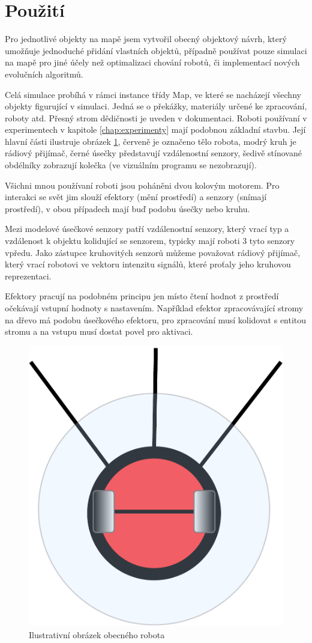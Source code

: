 \section*{Použití}
Pro jednotlivé objekty na mapě jsem vytvořil obecný objektový návrh, který umožňuje jednoduché přidání vlastních objektů, případně používat pouze simulaci na mapě pro jiné účely než optimalizaci chování robotů, či implementací nových evolučních algoritmů.
\par
Celá simulace probíhá v rámci instance třídy Map, ve které se nacházejí všechny objekty figurující v simulaci. Jedná se o překážky, materiály určené ke zpracování, roboty atd. Přesný strom dědičnosti je uveden v dokumentaci. Roboti používaní v experimentech v kapitole \ref{chap:experimenty} mají podobnou základní stavbu. Její hlavní části ilustruje obrázek \ref{obr03:robotModel}, červeně je označeno tělo robota, modrý kruh je rádiový přijímač, černé úsečky představují vzdálenostní senzory, šedivě stínované obdélníky zobrazují kolečka (ve vizuálním programu se nezobrazují).
\par 
Všichni mnou používaní roboti jsou poháněni dvou kolovým motorem. Pro interakci se svět jim slouží efektory (mění prostředí) a senzory (snímají prostředí), v obou případech mají buď podobu úsečky nebo kruhu.
\par
 Mezi modelové úsečkové senzory patří vzdálenostní senzory, který vrací typ a vzdálenost k objektu kolidující se senzorem, typicky mají roboti 3 tyto senzory vpředu. Jako zástupce kruhovitých senzorů můžeme považovat rádiový přijímač, který vrací robotovi ve vektoru intenzitu signálů, které proťaly jeho kruhovou reprezentaci.
 \par 
 Efektory pracují na podobném principu jen místo čtení hodnot z prostředí očekávají vstupní hodnoty s nastavením. Například efektor zpracovávající stromy na dřevo má podobu úsečkového efektoru, pro zpracování musí kolidovat s entitou stromu a na vstupu musí dostat povel pro aktivaci. 
 \begin{figure}[h]\centering
	\includegraphics[scale=0.3]{../img/RobotModel}
	\caption{Ilustrativní obrázek obecného robota}
	\label{obr03:robotModel}
\end{figure}
